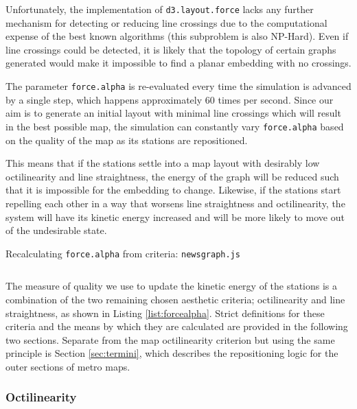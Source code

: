 Unfortunately, the implementation of \texttt{d3.layout.force} lacks any further mechanism for detecting or reducing line crossings due to the computational expense of the best known algorithms (this subproblem is also NP-Hard). Even if line crossings could be detected, it is likely that the topology of certain graphs generated would make it impossible to find a planar embedding with no crossings.

The parameter \texttt{force.alpha} is re-evaluated every time the simulation is advanced by a single step, which happens approximately 60 times per second. Since our aim is to generate an initial layout with minimal line crossings which will result in the best possible map, the simulation can constantly vary \texttt{force.alpha} based on the quality of the map as its stations are repositioned. 

This means that if the stations settle into a map layout with desirably low octilinearity and line straightness, the energy of the graph will be reduced such that it is impossible for the embedding to change. Likewise, if the stations start repelling each other in a way that worsens line straightness and octilinearity, the system will have its kinetic energy increased and will be more likely to move out of the undesirable state.\\

\begin{listing}[htbp!]
\caption{Recalculating \texttt{force.alpha} from  criteria: \texttt{newsgraph.js}}
\label{list:forcealpha}
\inputminted[fontsize=\footnotesize,linenos,numbersep=5pt,firstline=98, lastline=108]{js}{../src/webUtils/newsgraph.js}
\end{listing}

The measure of quality we use to update the kinetic energy of the stations is a combination of the two remaining chosen aesthetic criteria; octilinearity and line straightness, as shown in Listing \ref{list:forcealpha}. Strict definitions for these criteria and the means by which they are calculated are provided in the following two sections. Separate from the map octilinearity criterion but using the same principle is Section \ref{sec:termini}, which describes the repositioning logic for the outer sections of metro maps.

\subsubsection{Octilinearity}

